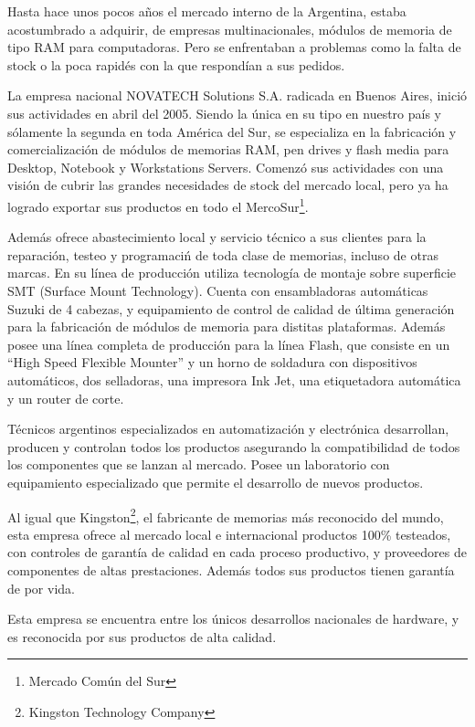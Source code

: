 \documentclass[%
 	final,
%
	notitlepage,
	narroweqnarray,
	inline,
 	twoside,
	]{ieee}
\begin{document}
Hasta hace unos pocos a\~nos el mercado interno de la Argentina, estaba acostumbrado a adquirir, de empresas multinacionales, m\'odulos de memoria de tipo RAM para computadoras. Pero se enfrentaban a problemas como la falta de stock o la poca rapid\'es con la que respond\'ian a sus pedidos.

La empresa nacional NOVATECH Solutions S.A. radicada en Buenos Aires, inici\'o sus actividades en abril del 2005. Siendo la \'unica en su tipo en nuestro pa\'is y s\'olamente la segunda en toda Am\'erica del Sur, se especializa en la fabricaci\'on y comercializaci\'on de m\'odulos de memorias RAM, pen drives y flash media para Desktop, Notebook y Workstations Servers. Comenz\'o sus actividades con una visi\'on de cubrir las grandes necesidades de stock del mercado local, pero ya ha logrado exportar sus productos en todo el MercoSur\footnote{Mercado Com\'un del Sur\cite{mercosur}}.

Adem\'as ofrece abastecimiento local y servicio t\'ecnico a sus clientes para la reparaci\'on, testeo y programaci\'n de toda clase de memorias, incluso de otras marcas. En su l\'inea de producci\'on utiliza tecnolog\'ia de montaje sobre superficie SMT (Surface Mount Technology). Cuenta con ensambladoras autom\'aticas Suzuki de 4 cabezas, y equipamiento de control de calidad de \'ultima generaci\'on para la fabricaci\'on de m\'odulos de memoria para distitas plataformas. Adem\'as posee una l\'inea completa de producci\'on para la l\'inea Flash, que consiste en un ``High Speed Flexible Mounter'' y un horno de soldadura con dispositivos autom\'aticos, dos selladoras, una impresora Ink Jet, una etiquetadora autom\'atica y un router de corte.

T\'ecnicos argentinos especializados en automatizaci\'on y electr\'onica desarrollan, producen y controlan todos los productos asegurando la compatibilidad de todos los componentes que se lanzan al mercado. Posee un laboratorio con equipamiento especializado que permite el desarrollo de nuevos productos.

Al igual que Kingston\footnote{Kingston Technology Company\cite{kingston}}, el fabricante de memorias m\'as reconocido del mundo, esta empresa ofrece al mercado local e internacional productos 100\% testeados, con controles de garant\'ia de calidad en cada proceso productivo, y proveedores de componentes de altas prestaciones. Adem\'as todos sus productos tienen garant\'ia de por vida.

Esta empresa se encuentra entre los \'unicos desarrollos nacionales de hardware, y es reconocida por sus productos de alta calidad.
\end{document}
